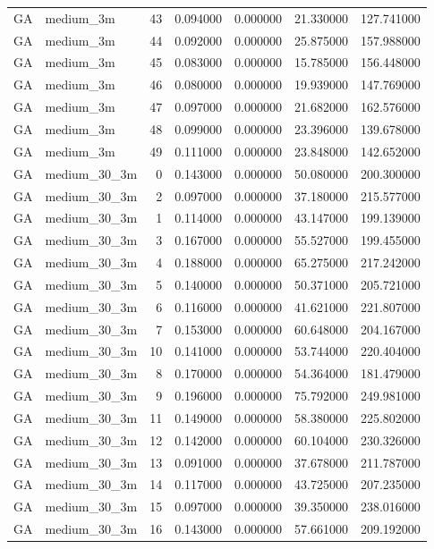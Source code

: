 \begin{tabular}{llrrrrr}
GA & medium_3m & 43 & 0.094000 & 0.000000 & 21.330000 & 127.741000 \\
GA & medium_3m & 44 & 0.092000 & 0.000000 & 25.875000 & 157.988000 \\
GA & medium_3m & 45 & 0.083000 & 0.000000 & 15.785000 & 156.448000 \\
GA & medium_3m & 46 & 0.080000 & 0.000000 & 19.939000 & 147.769000 \\
GA & medium_3m & 47 & 0.097000 & 0.000000 & 21.682000 & 162.576000 \\
GA & medium_3m & 48 & 0.099000 & 0.000000 & 23.396000 & 139.678000 \\
GA & medium_3m & 49 & 0.111000 & 0.000000 & 23.848000 & 142.652000 \\
GA & medium_30_3m & 0 & 0.143000 & 0.000000 & 50.080000 & 200.300000 \\
GA & medium_30_3m & 2 & 0.097000 & 0.000000 & 37.180000 & 215.577000 \\
GA & medium_30_3m & 1 & 0.114000 & 0.000000 & 43.147000 & 199.139000 \\
GA & medium_30_3m & 3 & 0.167000 & 0.000000 & 55.527000 & 199.455000 \\
GA & medium_30_3m & 4 & 0.188000 & 0.000000 & 65.275000 & 217.242000 \\
GA & medium_30_3m & 5 & 0.140000 & 0.000000 & 50.371000 & 205.721000 \\
GA & medium_30_3m & 6 & 0.116000 & 0.000000 & 41.621000 & 221.807000 \\
GA & medium_30_3m & 7 & 0.153000 & 0.000000 & 60.648000 & 204.167000 \\
GA & medium_30_3m & 10 & 0.141000 & 0.000000 & 53.744000 & 220.404000 \\
GA & medium_30_3m & 8 & 0.170000 & 0.000000 & 54.364000 & 181.479000 \\
GA & medium_30_3m & 9 & 0.196000 & 0.000000 & 75.792000 & 249.981000 \\
GA & medium_30_3m & 11 & 0.149000 & 0.000000 & 58.380000 & 225.802000 \\
GA & medium_30_3m & 12 & 0.142000 & 0.000000 & 60.104000 & 230.326000 \\
GA & medium_30_3m & 13 & 0.091000 & 0.000000 & 37.678000 & 211.787000 \\
GA & medium_30_3m & 14 & 0.117000 & 0.000000 & 43.725000 & 207.235000 \\
GA & medium_30_3m & 15 & 0.097000 & 0.000000 & 39.350000 & 238.016000 \\
GA & medium_30_3m & 16 & 0.143000 & 0.000000 & 57.661000 & 209.192000 \\

\end{tabular}
